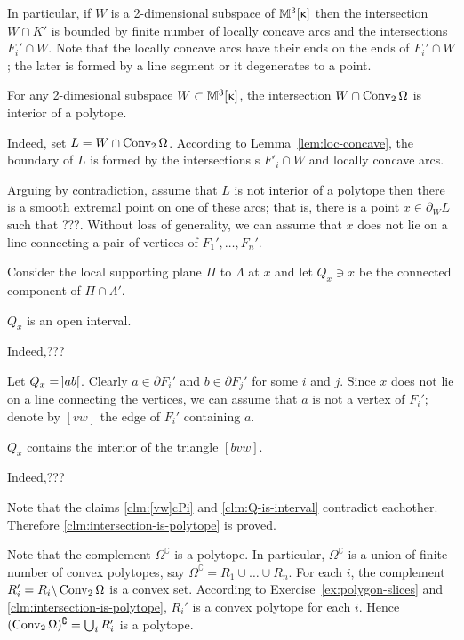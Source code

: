 In particular, if $W$ is a 2-dimensional subspace of $\mathbb{M}_{{}}^{3}[{\upkappa}]$ 
then the intersection $W\cap K'$ is bounded 
by finite number of locally concave arcs and the  intersections $F_i'\cap W$.
Note that the locally concave arcs have their ends on the ends of $F_i'\cap W$;
the later is formed by a line segment or it degenerates to a point.

\begin{clm}{}\label{clm:intersection-is-polytope}
For any 2-dimesional subspace $W\subset\Lob{3}{\kappa}$,
the intersection $W\cap \Conv_2 \Omega$ is interior of a polytope.
\end{clm}

Indeed, set $L=W\cap \Conv_2 \Omega$.
According to Lemma~\ref{lem:loc-concave}, 
the boundary of $L$ is formed by the intersections s $F'_i\cap W$
and locally concave arcs.

Arguing by contradiction, 
assume that $L$ is not interior of a polytope then there is a smooth extremal point on one of these arcs; 
that is, there is a point $x\in\partial_W L$ such that ???.
Without loss of generality, we can assume that $x$ does not lie on a line connecting a pair of vertices of $F_1',\dots,F_n'$.

Consider the local supporting plane $\Pi$ to $\Lambda$ at $x$
and let $Q_x\ni x$ be the connected component of $\Pi\cap\Lambda'$.

\begin{clm}{}\label{clm:Q-is-interval}
$Q_x$ is an open interval. 
\end{clm}

Indeed,???\claimqeds

Let $Q_x=\hskip-0.1em\left]ab\right[$.
Clearly $a\in\partial F_i'$ and $b\in\partial F_j'$
for some $i$ and $j$.
Since $x$ does not lie on a line connecting the vertices,
we can assume that $a$ is not a vertex of $F_i'$;
denote by $[vw]$ the edge of $F_i'$ containing $a$.

\begin{clm}{}\label{clm:[vw]cPi}
$Q_x$ contains the interior of the triangle $[bvw]$.
\end{clm}

Indeed,???\claimqeds

Note that the claims \ref{clm:[vw]cPi} and \ref{clm:Q-is-interval} contradict eachother.
Therefore \ref{clm:intersection-is-polytope} is proved.


Note that the complement $\Omega^\complement$ is a polytope.
In particular, $\Omega^\complement$ is a union of finite number of convex polytopes,
say 
$\Omega^\complement=R_1\cup\dots\cup R_n$.
For each $i$, the complement $R_i'=R_i\backslash \mathop{\rm Conv}\nolimits_2\Omega$ is a convex set.
According to 
Exercise~\ref{ex:polygon-slices} 
and \ref{clm:intersection-is-polytope}, 
$R_i'$ is a convex polytope for each $i$.
Hence $(\mathop{\rm Conv}\nolimits_2\Omega)^\complement=\bigcup_i R_i'$ is a polytope.
\qeds


